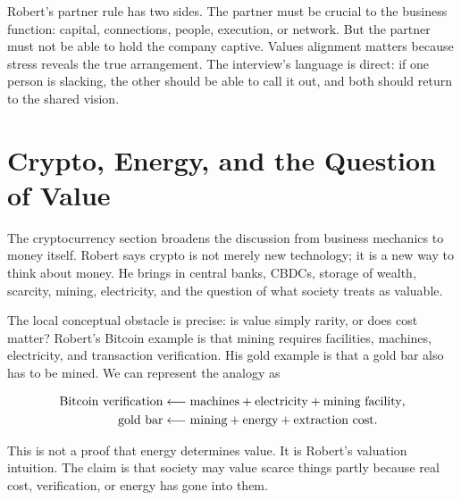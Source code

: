 Robert's partner rule has two sides. The partner must be crucial to the business function: capital, connections, people, execution, or network. But the partner must not be able to hold the company captive. Values alignment matters because stress reveals the true arrangement. The interview's language is direct: if one person is slacking, the other should be able to call it out, and both should return to the shared vision.

\section{Crypto, Energy, and the Question of Value}

The cryptocurrency section broadens the discussion from business mechanics to money itself. Robert says crypto is not merely new technology; it is a new way to think about money. He brings in central banks, CBDCs, storage of wealth, scarcity, mining, electricity, and the question of what society treats as valuable.

The local conceptual obstacle is precise: is value simply rarity, or does cost matter? Robert's Bitcoin example is that mining requires facilities, machines, electricity, and transaction verification. His gold example is that a gold bar also has to be mined. We can represent the analogy as

\begin{align}
\hbox{Bitcoin verification}
&\longleftarrow
\hbox{machines}
+
\hbox{electricity}
+
\hbox{mining facility},
\\
\hbox{gold bar}
&\longleftarrow
\hbox{mining}
+
\hbox{energy}
+
\hbox{extraction cost}.
\end{align}

This is not a proof that energy determines value. It is Robert's valuation intuition. The claim is that society may value scarce things partly because real cost, verification, or energy has gone into them.

\begin{figure}
\centering
{}
\end{figure}

